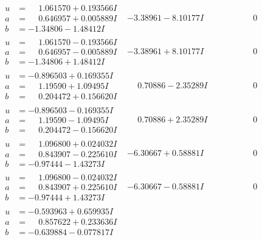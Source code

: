 \documentclass[1p]{elsarticle_modified}
\theoremstyle{definition}
\begin{document}
$$\begin{array}{c|c|c}
\begin{aligned}
u &= \phantom{-}1.061570 + 0.193566 I \\
a &= \phantom{-}0.646957 + 0.005889 I \\
b &= -1.34806 - 1.48412 I\end{aligned}
 & -3.38961 - 8.10177 I & \phantom{-0.000000 } 0 \\ \hline\begin{aligned}
u &= \phantom{-}1.061570 - 0.193566 I \\
a &= \phantom{-}0.646957 - 0.005889 I \\
b &= -1.34806 + 1.48412 I\end{aligned}
 & -3.38961 + 8.10177 I & \phantom{-0.000000 } 0 \\ \hline\begin{aligned}
u &= -0.896503 + 0.169355 I \\
a &= \phantom{-}1.19590 + 1.09495 I \\
b &= \phantom{-}0.204472 + 0.156620 I\end{aligned}
 & \phantom{-}0.70886 - 2.35289 I & \phantom{-0.000000 } 0 \\ \hline\begin{aligned}
u &= -0.896503 - 0.169355 I \\
a &= \phantom{-}1.19590 - 1.09495 I \\
b &= \phantom{-}0.204472 - 0.156620 I\end{aligned}
 & \phantom{-}0.70886 + 2.35289 I & \phantom{-0.000000 } 0 \\ \hline\begin{aligned}
u &= \phantom{-}1.096800 + 0.024032 I \\
a &= \phantom{-}0.843907 - 0.225610 I \\
b &= -0.97444 - 1.43273 I\end{aligned}
 & -6.30667 + 0.58881 I & \phantom{-0.000000 } 0 \\ \hline\begin{aligned}
u &= \phantom{-}1.096800 - 0.024032 I \\
a &= \phantom{-}0.843907 + 0.225610 I \\
b &= -0.97444 + 1.43273 I\end{aligned}
 & -6.30667 - 0.58881 I & \phantom{-0.000000 } 0 \\ \hline\begin{aligned}
u &= -0.593963 + 0.659935 I \\
a &= \phantom{-}0.857622 + 0.233636 I \\
b &= -0.639884 - 0.077817 I\end{aligned}

\end{array}$$
\end{document}
